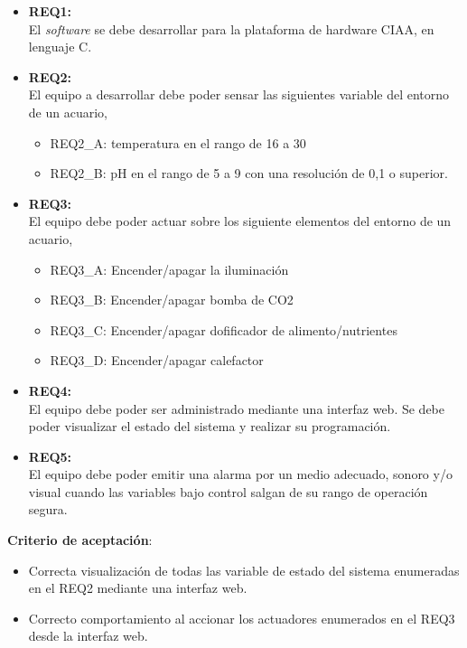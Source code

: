 \begin{itemize}
	\item \textbf{REQ1:}\\ El \textit{software} se debe desarrollar para la plataforma de hardware CIAA, en lenguaje C.
	\item \textbf{REQ2:}\\ El equipo a desarrollar debe poder sensar las siguientes variable del entorno de un acuario,
	\begin{itemize}
		\item REQ2\_A: temperatura en el rango de 16 a 30 %
		\item REQ2\_B: pH en el rango de 5 a 9 con una resolución de 0,1 o superior.
	\end{itemize}
	\item \textbf{REQ3:}\\ El equipo debe poder actuar sobre los siguiente elementos del entorno de un acuario,
	\begin{itemize}
		\item REQ3\_A: Encender/apagar la iluminación
		\item REQ3\_B: Encender/apagar bomba de CO2
		\item REQ3\_C: Encender/apagar dofificador de alimento/nutrientes
		\item REQ3\_D: Encender/apagar calefactor
	\end{itemize}
	\item \textbf{REQ4:}\\ El equipo debe poder ser administrado mediante una interfaz web. Se debe poder visualizar el estado del sistema y realizar su programación.
	\item \textbf{REQ5:}\\ El equipo debe poder emitir una alarma por un medio adecuado, sonoro y/o visual cuando las variables bajo control salgan de su rango de operación segura.
\end{itemize}

\textbf{Criterio de aceptación}:
	\begin{itemize}
		\item Correcta visualización de todas las variable de estado del sistema enumeradas en el REQ2 mediante una interfaz web.
		\item Correcto comportamiento al accionar los actuadores enumerados en el REQ3 desde la interfaz web.
	\end{itemize}

